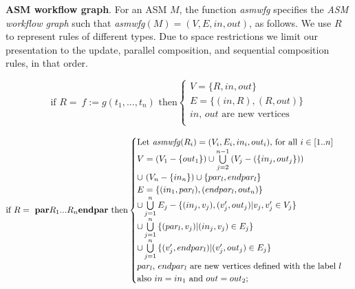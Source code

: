 \vspace*{0.25cm}
\noindent \textbf{ASM workflow graph}. For an ASM $M$, the function \textit{asmwfg} specifies the \textit{ASM workflow graph} such that \textit{asmwfg}$(M) = (V, E, in, out)$, as follows. We use $R$ to represent rules of different types. Due to space restrictions we limit our presentation to the update, parallel composition, and sequential composition rules, in that order.

\begin{equation*}
	\text{if $R = \ f := g(t_1,...,t_n)$ then}
	\begin{cases}
			\text{$V = \{R, in, out\}$}\\
			\text{$E = \{(in, R), (R, out)\}$}\\
			\text{$in$, $out$ are new vertices}\\
	\end{cases}
\end{equation*}

\begin{equation*}
	\text{if $R = \ \textbf{par} R_1 ... R_n \textbf{endpar}$ then}
	\begin{cases}
			\text{Let \textit{asmwfg}$(R_i) = (V_i, E_i, in_i, out_i)$, for all $i \in [1..n]$}\\
			\text{$V = (V_1 - \{out_1\}) \cup \bigcup \limits_{j=2}^{n-1}{(V_j - (\{in_j, out_j\}))}$}\\
			\text{$\cup \ (V_n - \{in_n\}) \cup  \{par_l, endpar_l\}$}\\
			\text{$E = \{(in_1, par_l), (endpar_l, out_n)\}$}\\
			\text{$\cup \bigcup \limits_{j=1}^{n}{E_j - \{(in_j, v_j), (v_j', out_j) | v_j, v_j' \in V_j\}} $}\\
			\text{$\cup \bigcup \limits_{j=1}^{n}{\{(par_l, v_j) | (in_j, v_j) \in E_j\}} $}\\
			\text{$\cup \bigcup \limits_{j=1}^{n}{\{(v_j', endpar_l) | (v_j', out_j) \in E_j\}} $}\\
			\text{$par_l$, $endpar_l$ are new vertices defined with the label $l$}\\
			\text{also $in = in_1$ and $out = out_2$;}\\
	\end{cases}
\end{equation*}

